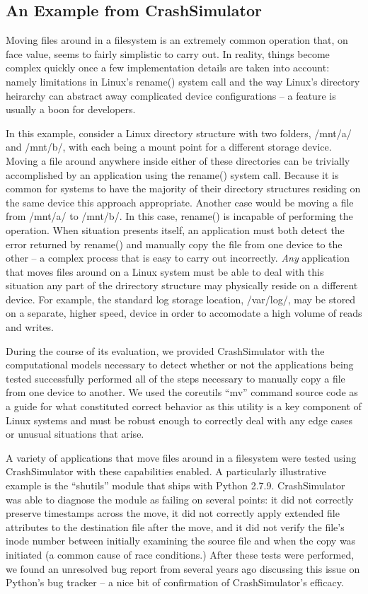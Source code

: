     \subsection{An Example from CrashSimulator}

    Moving files around in a filesystem is an extremely common operation that, on face value, seems to fairly simplistic
    to carry out.  In reality, things become complex quickly once a few implementation details are taken into account:
    namely limitations in Linux's rename() system call and the way Linux's directory heirarchy can abstract away
    complicated device configurations -- a feature is usually a boon for developers.

    In this example, consider a Linux directory structure with two folders, /mnt/a/ and /mnt/b/, with each being a mount
    point for a different storage device.  Moving a file around anywhere inside either of these directories can be
    trivially accomplished by an application using the rename() system call.  Because it is common for systems to have
    the majority of their directory structures residing on the same device this approach appropriate.  Another case
    would be moving a file from /mnt/a/ to /mnt/b/.  In this case, rename() is incapable of performing the operation.
    When situation presents itself, an application must both detect the error returned by rename() and manually copy the
    file from one device to the other -- a complex process that is easy to carry out incorrectly.  \emph{Any}
    application that moves files around on a Linux system must be able to deal with this situation any part of the
    drirectory structure may physically reside on a different device.  For example, the standard log storage location,
    /var/log/, may be stored on a separate, higher speed, device in order to accomodate a high volume of reads and writes.

    During the course of its evaluation, we provided CrashSimulator with the computational models necessary to detect
    whether or not the applications being tested successfully performed all of the steps necessary to manually copy a
    file from one device to another.  We used the coreutils ``mv'' command source code as a guide for what constituted
    correct behavior as this utility is a key component of Linux systems and must be robust enough to correctly deal
    with any edge cases or unusual situations that arise.

    A variety of applications that move files around in a filesystem were tested using CrashSimulator with these
    capabilities enabled.  A particularly illustrative example is the ``shutils'' module that ships with Python 2.7.9.
    CrashSimulator was able to diagnose the module as failing on several points: it did not correctly preserve
    timestamps across the move, it did not correctly apply extended file attributes to the destination file after the
    move, and it did not verify the file's inode number between initially examining the source file and when the copy
    was initiated (a common cause of race conditions.)  After these tests were performed, we found an unresolved bug
    report from several years ago discussing this issue on Python's bug tracker -- a nice bit of confirmation of
    CrashSimulator's efficacy.

